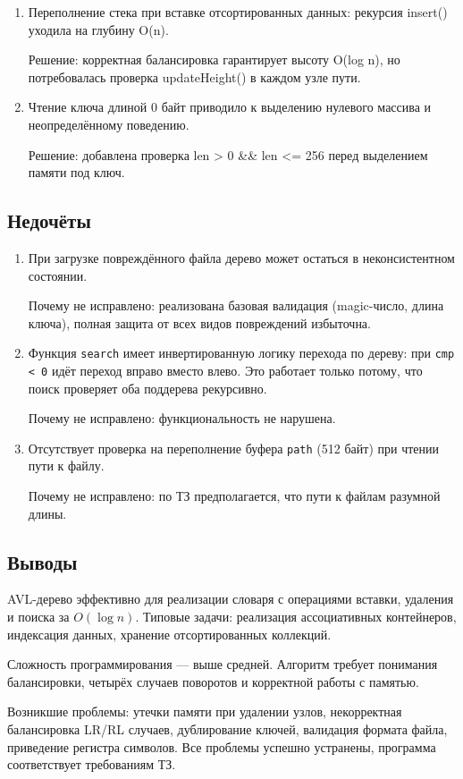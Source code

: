 \documentclass[12pt]{article}
\begin{document}
\begin{enumerate}
\item Переполнение стека при вставке отсортированных данных: рекурсия insert() уходила на глубину O(n).

Решение: корректная балансировка гарантирует высоту O(log n), но потребовалась проверка updateHeight() в каждом узле пути.

\item Чтение ключа длиной 0 байт приводило к выделению нулевого массива и неопределённому поведению.

Решение: добавлена проверка len > 0 \&\& len <= 256 перед выделением памяти под ключ.

\end{enumerate}


\subsection*{Недочёты}

\begin{enumerate}
\item При загрузке повреждённого файла дерево может остаться в неконсистентном состоянии.

Почему не исправлено: реализована базовая валидация (magic-число, длина ключа), полная защита от всех видов повреждений избыточна.

\item Функция \texttt{search} имеет инвертированную логику перехода по дереву: при \texttt{cmp < 0} идёт переход вправо вместо влево.
Это работает только потому, что поиск проверяет оба поддерева рекурсивно.

Почему не исправлено: функциональность не нарушена.

\item Отсутствует проверка на переполнение буфера \texttt{path} (512 байт) при чтении пути к файлу.

Почему не исправлено: по ТЗ предполагается, что пути к файлам разумной длины.


\end{enumerate}


\subsection*{Выводы}

AVL-дерево эффективно для реализации словаря с операциями вставки, удаления и поиска за $O(\log n)$.
Типовые задачи: реализация ассоциативных контейнеров, индексация данных, хранение отсортированных коллекций.

Сложность программирования — выше средней. Алгоритм требует понимания балансировки, четырёх случаев поворотов и корректной работы с памятью.

Возникшие проблемы: утечки памяти при удалении узлов, некорректная балансировка LR/RL случаев, дублирование ключей,
валидация формата файла, приведение регистра символов. Все проблемы успешно устранены, программа соответствует требованиям ТЗ.
\end{document}
